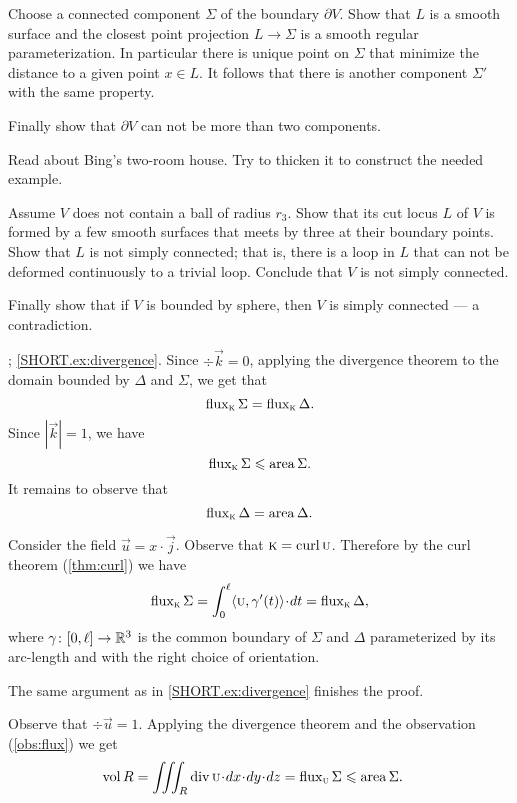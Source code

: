 Choose a connected component $\Sigma$ of the boundary $\partial V$.
Show that $L$ is a smooth surface and the closest point projection $L\to \Sigma$ is a smooth regular parameterization.
In particular there is unique point on $\Sigma$ that minimize the distance to a given point $x\in L$.
It follows that there is another component $\Sigma'$ with the same property.

Finally show that $\partial V$ can not be more than two components.

Read about Bing's two-room house.
Try to thicken it to construct the needed example.

Assume $V$ does not contain a ball of radius $r_3$.
Show that its cut locus $L$ of $V$ is formed by a few smooth surfaces that meets by three at their boundary points.
Show that $L$ is not simply connected; that is, there is a loop in $L$ that can not be deformed continuously to a trivial loop.
Conclude that $V$ is not simply connected.

Finally show that if $V$ is bounded by sphere, then $V$ is simply connected --- a contradiction. 

\parbf{\ref{ex:divergence-1}}; \ref{SHORT.ex:divergence}.
Since $\div\vec k=0$, applying the divergence theorem to the domain bounded by $\Delta$ and $\Sigma$, we get that 
\[\mathop{\rm flux}\nolimits_{\textsc k}\Sigma=\mathop{\rm flux}\nolimits_{\textsc k}\Delta.\]
Since $|\vec k|=1$, we have 
\[\mathop{\rm flux}\nolimits_{\textsc k}\Sigma\leqslant \mathop{\rm area}\nolimits\Sigma.\]
It remains to observe that
\[\mathop{\rm flux}\nolimits_{\textsc k}\Delta=\mathop{\rm area}\nolimits\Delta.\]


 Consider the field $\vec u=x\cdot\vec j$.
Observe that $\textsc k=\mathop{\rm curl}\nolimits \textsc u$.
Therefore by the curl theorem (\ref{thm:curl}) we have 
\[\flux_{\vec k}\Sigma
=
\int_0^\ell\langle\vec u,\gamma'(t)\rangle\cdot dt
=
\flux_{\vec k}\Delta,\]
where $\gamma\colon[0,\ell]\to\mathbb{R}^3$ is the common boundary of $\Sigma$ and $\Delta$ parameterized by its arc-length and with the right choice of orientation.

The same argument as in \ref{SHORT.ex:divergence} finishes the proof.



Observe that $\div\vec u=1$.
Applying the divergence theorem and the observation (\ref{obs:flux}) we get
\begin{align*}
\vol R&=\iiint_R\div\vec u\cdot dx\cdot dy\cdot dz
=
\flux_{\vec u}\Sigma
\le
\area\Sigma.
\end{align*}




